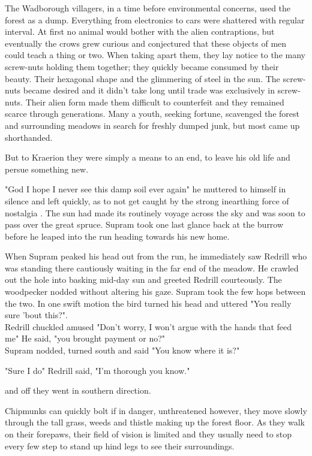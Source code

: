 \documentclass[smalldemyvopaper,11pt,twoside,onecolumn,openright,extrafontsizes]{memoir}
\begin{document}
The Wadborough villagers, in a time before environmental concerns, used the forest as a dump. Everything from electronics to cars were shattered with regular interval. At first no animal would bother with the alien contraptions, but eventually the crows grew curious and conjectured that these objects of men could teach a thing or two. When taking apart them, they lay notice to the many screw-nuts holding them together; they quickly became consumed by their beauty. Their hexagonal shape and the glimmering of steel in the sun. The screw-nuts became desired and it didn't take long until trade was exclusively in screw-nuts. Their alien form made them difficult to counterfeit and they remained scarce through generations. Many a youth, seeking fortune, scavenged the forest and surrounding meadows in search for freshly dumped junk, but most came up shorthanded. 

But to Kraerion they were simply a means to an end, to leave his old life and persue something new. 

 "God I hope I never see this damp soil ever again" he muttered to himself in silence and left quickly, as to not get caught by the strong inearthing force of nostalgia . The sun had made its routinely voyage across the sky and was soon to pass over the great spruce. Supram took one last glance back at the burrow before he leaped into the run heading towards his new home. 

When Supram peaked his head out from the run, he immediately saw Redrill who was standing there cautiously waiting in the far end of the meadow. He crawled out the hole into basking mid-day sun and greeted Redrill courteously. The woodpecker nodded without altering his gaze. Supram took the few hops between the two. In one swift motion the bird turned his head and uttered "You really sure 'bout this?".\\


Redrill chuckled amused "Don't worry, I won't argue with the hands that feed me" He said, "you brought payment or no?"\\

Supram nodded, turned south and said "You know where it is?"

"Sure I do" Redrill said, "I'm thorough you know."

and off they went in southern direction.

Chipmunks can quickly bolt if in danger, unthreatened however, they move slowly through the tall grass, weeds and thistle making up the forest floor. As they walk on their forepaws, their field of vision is limited and they usually need to stop every few step to stand up hind legs to see their surroundings.
\end{document}
